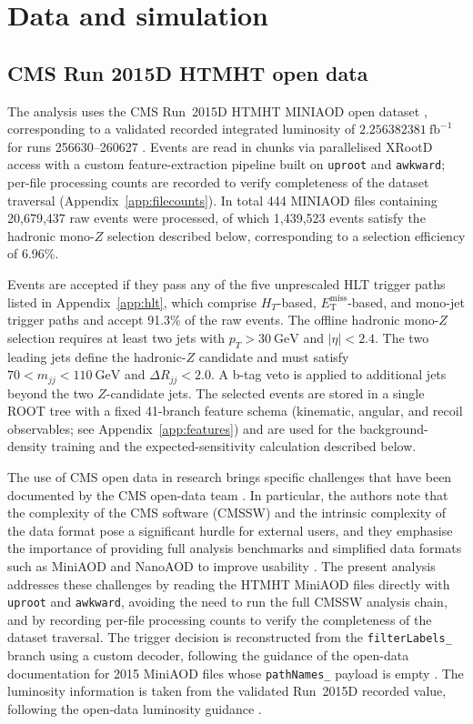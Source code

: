 \documentclass[11pt,a4paper,twocolumn]{article}
\newcommand{\GeV}{\text{GeV}}
\newcommand{\MET}{\ensuremath{E_{\mathrm{T}}^{\mathrm{miss}}}}
\newcommand{\invfb}{\ensuremath{\mathrm{fb}^{-1}}}
\begin{document}
\section{Data and simulation}
\label{sec:data}

\subsection{CMS Run 2015D HTMHT open data}

The analysis uses the CMS Run~2015D HTMHT MINIAOD open dataset
\cite{cms_htmht_2015d}, corresponding to a validated recorded integrated
luminosity of $2.256382381~\invfb$ for runs 256630--260627
\cite{cms_data_policy,cms_lumi_guide}. Events are read in chunks via
parallelised XRootD access with a custom feature-extraction pipeline built on
\texttt{uproot} and \texttt{awkward}; per-file processing counts are recorded
to verify completeness of the dataset traversal
(Appendix~\ref{app:filecounts}). In total 444 MINIAOD files containing
20{,}679{,}437 raw events were processed, of which 1{,}439{,}523 events
satisfy the hadronic mono-$Z$ selection described below, corresponding to a
selection efficiency of 6.96\%.

Events are accepted if they pass any of the five unprescaled HLT trigger
paths listed in Appendix~\ref{app:hlt}, which comprise $H_T$-based,
\MET-based, and mono-jet trigger paths and accept 91.3\% of the raw events.
The offline hadronic mono-$Z$ selection requires at least two jets with
$p_T > 30~\GeV$ and $|\eta| < 2.4$. The two leading jets define the
hadronic-$Z$ candidate and must satisfy $70 < m_{jj} < 110~\GeV$ and
$\Delta R_{jj} < 2.0$. A b-tag veto is applied to additional jets beyond the
two $Z$-candidate jets. The selected events are stored in a single ROOT tree
with a fixed 41-branch feature schema (kinematic, angular, and recoil
observables; see Appendix~\ref{app:features}) and are used for the
background-density training and the expected-sensitivity calculation
described below.

The use of CMS open data in research brings specific challenges that have
been documented by the CMS open-data team \cite{lassila_cms_opendata}.
In particular, the authors note that the complexity of the CMS software
(CMSSW) and the intrinsic complexity of the data format pose a significant
hurdle for external users, and they emphasise the importance of providing
full analysis benchmarks and simplified data formats such as MiniAOD and
NanoAOD to improve usability \cite{lassila_cms_opendata}. The present
analysis addresses these challenges by reading the HTMHT MiniAOD files
directly with \texttt{uproot} and \texttt{awkward}, avoiding the need to
run the full CMSSW analysis chain, and by recording per-file processing
counts to verify the completeness of the dataset traversal. The trigger
decision is reconstructed from the \texttt{filterLabels\_} branch using a
custom decoder, following the guidance of the open-data documentation for
2015 MiniAOD files whose \texttt{pathNames\_} payload is empty
\cite{lassila_cms_opendata}. The luminosity information is taken from the
validated Run~2015D recorded value, following the open-data luminosity
guidance \cite{cms_lumi_guide}.
\end{document}
